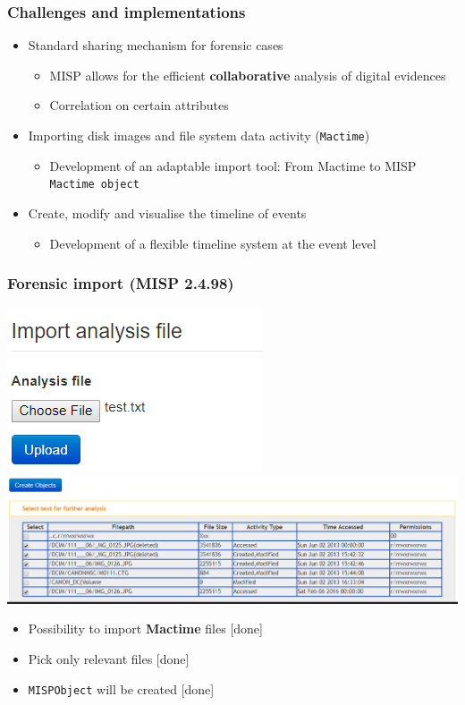 \begin{frame}
\frametitle{Challenges and implementations}
    \begin{itemize}
        \item Standard sharing mechanism for forensic cases
            \begin{itemize}
                \item MISP allows for the efficient \textbf{collaborative} analysis of digital evidences
                \item Correlation on certain attributes
            \end{itemize}
        \item Importing disk images and file system data activity (\texttt{Mactime})
            \begin{itemize}
                \item Development of an adaptable import tool: From Mactime to MISP \texttt{Mactime object}
            \end{itemize}
        \item Create, modify and visualise the timeline of events
            \begin{itemize}
                \item Development of a flexible timeline system at the event level
            \end{itemize}
    \end{itemize}
\end{frame}

\begin{frame}
        \frametitle{Forensic import (MISP 2.4.98)}
    \centering
    \includegraphics[scale=0.3]{pics/import.png}
    \includegraphics[scale=0.3]{pics/import-table.png}
    
    \begin{itemize}
        \item Possibility to import \textbf{Mactime} files [done]
        \item Pick only relevant files [done]
        \item \texttt{MISPObject} will be created [done]
    \end{itemize}
\end{frame}

